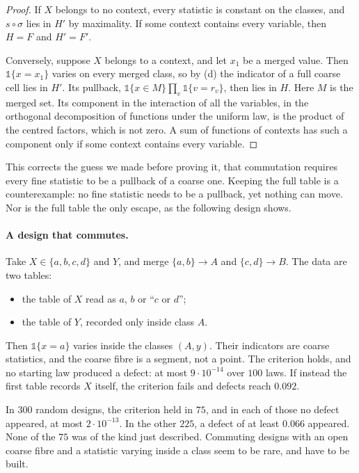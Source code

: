 \documentclass[11pt]{article}
\theoremstyle{definition}\newtheorem{definition}[theorem]{Definition}\newtheorem{remark}[theorem]{Remark}\newtheorem{example}[theorem]{Example}\newtheorem{problem}[theorem]{Open problem}\crefname{problem}{Problem}{Problems}
\begin{document}
\begin{proof}
If $X$ belongs to no context, every statistic is constant on the classes, and $s\circ\sigma$ lies in $H'$ by maximality. If some context contains every variable, then $H=F$ and $H'=F'$.

Conversely, suppose $X$ belongs to a context, and let $x_1$ be a merged value. Then $\mathbb 1\{x=x_1\}$ varies on every merged class, so by (d) the indicator of a full coarse cell lies in $H'$. Its pullback, $\mathbb 1\{x\in M\}\prod_v\mathbb 1\{v=r_v\}$, then lies in $H$. Here $M$ is the merged set. Its component in the interaction of all the variables, in the orthogonal decomposition of functions under the uniform law, is the product of the centred factors, which is not zero. A sum of functions of contexts has such a component only if some context contains every variable.
\end{proof}

This corrects the guess we made before proving it, that commutation requires every fine statistic to be a pullback of a coarse one. Keeping the full table is a counterexample: no fine statistic needs to be a pullback, yet nothing can move. Nor is the full table the only escape, as the following design shows.

\paragraph{A design that commutes.} Take $X\in\{a,b,c,d\}$ and $Y$, and merge $\{a,b\}\to A$ and $\{c,d\}\to B$. The data are two tables:
\begin{itemize}
\item the table of $X$ read as $a$, $b$ or ``$c$ or $d$'';
\item the table of $Y$, recorded only inside class $A$.
\end{itemize}
Then $\mathbb 1\{x=a\}$ varies inside the classes $(A,y)$. Their indicators are coarse statistics, and the coarse fibre is a segment, not a point. The criterion holds, and no starting law produced a defect: at most $9\cdot10^{-14}$ over $100$ laws. If instead the first table records $X$ itself, the criterion fails and defects reach $0.092$.

In $300$ random designs, the criterion held in $75$, and in each of those no defect appeared, at most $2\cdot10^{-13}$. In the other $225$, a defect of at least $0.066$ appeared. None of the $75$ was of the kind just described. Commuting designs with an open coarse fibre and a statistic varying inside a class seem to be rare, and have to be built.
\end{document}
